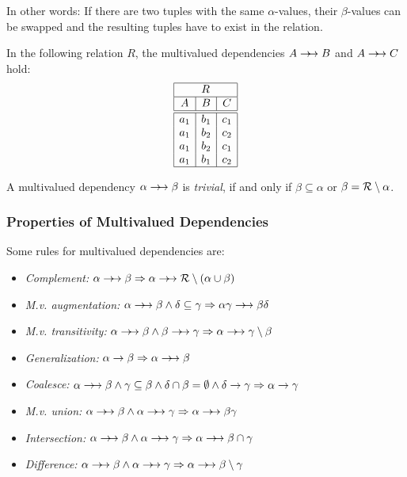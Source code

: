 In other words: If there are two tuples with the same $\alpha$-values, their $\beta$-values can be swapped and the resulting tuples have to exist in the relation.

\begin{example} In the following relation $R$, the multivalued dependencies $A \rightarrow\!\!\rightarrow B$ and $A \rightarrow\!\!\rightarrow C$ hold:
\[ \begin{array}{|c|c|c|}\hline
\multicolumn{3}{|c|}{R} \\\hline
A & B & C \\\hline\hline
a_1 & b_1 & c_1 \\
a_1 & b_2 & c_2 \\
a_1 & b_2 & c_1 \\
a_1 & b_1 & c_2 \\\hline
\end{array} \]
\vspace*{-1em}
\end{example}

A multivalued dependency $\alpha \rightarrow\!\!\rightarrow \beta$ is \emph{trivial}, if and only if $\beta\subseteq\alpha$ or $\beta = \mathcal{R}\setminus\alpha$.




\subsubsection[Properties of MVD]{Properties of Multivalued Dependencies}

Some rules for multivalued dependencies are:
\begin{itemize}
\item \emph{Complement:} $\alpha \rightarrow\!\!\rightarrow \beta \Rightarrow \alpha \rightarrow\!\!\rightarrow \mathcal{R}\setminus (\alpha \cup \beta)$
\item \emph{M.v. augmentation:}	$\alpha\rightarrow\!\!\rightarrow\beta \wedge \delta\subseteq\gamma \Rightarrow \alpha\gamma \rightarrow\!\!\rightarrow \beta\delta$
\item \emph{M.v. transitivity:} $\alpha\rightarrow\!\!\rightarrow\beta \wedge \beta\rightarrow\!\!\rightarrow\gamma \Rightarrow \alpha\rightarrow\!\!\rightarrow\gamma\setminus\beta$
\item \emph{Generalization:} $\alpha\rightarrow\beta \Rightarrow \alpha\rightarrow\!\!\rightarrow\beta$
\item \emph{Coalesce:} $\alpha\rightarrow\!\!\rightarrow\beta \wedge \gamma\subseteq\beta \wedge \delta\cap\beta=\emptyset \wedge \delta\rightarrow\gamma \Rightarrow \alpha\rightarrow \gamma$
\item \emph{M.v. union:} $\alpha\rightarrow\!\!\rightarrow\beta \wedge \alpha \rightarrow\!\!\rightarrow\gamma \Rightarrow \alpha \rightarrow\!\!\rightarrow \beta\gamma$
\item \emph{Intersection:} $\alpha\rightarrow\!\!\rightarrow\beta \wedge \alpha\rightarrow\!\!\rightarrow\gamma \Rightarrow \alpha \rightarrow\!\!\rightarrow \beta \cap \gamma$
\item \emph{Difference:} $\alpha\rightarrow\!\!\rightarrow\beta \wedge \alpha\rightarrow\!\!\rightarrow\gamma \Rightarrow \alpha\rightarrow\!\!\rightarrow\beta\setminus\gamma$
\end{itemize}

